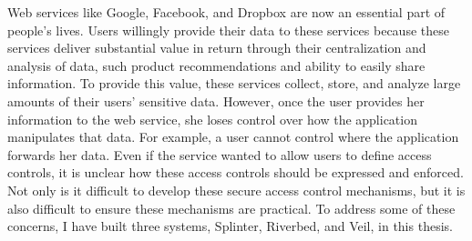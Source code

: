 % 
% 
%

Web services like Google, Facebook, and Dropbox are now an essential part of people's lives. Users
willingly provide their data to these services because these services deliver substantial value in return
through their centralization and analysis of data, such product recommendations and ability to easily
share information. To provide this value, 
these services collect, store, and analyze large amounts of their users' sensitive
data. However, once the user provides her information to the web service, she loses control over how the
application manipulates that data. For example, a user cannot control where the application forwards
her data. Even if the service wanted to allow users to define access controls, it is unclear how these access
controls should be expressed and enforced. Not only is it difficult to develop these secure access control
mechanisms, but it is also difficult to ensure these mechanisms are practical. To address some of these concerns, I have built three systems, Splinter, Riverbed, and Veil, in this thesis.